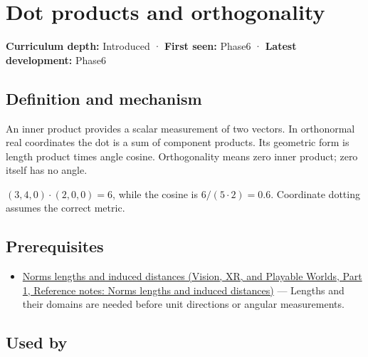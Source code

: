 \hypertarget{appendix-8bc4e8fc547c}{}\label{referencestart:appendix-8bc4e8fc547c}
\section{Dot products and orthogonality}\label{appendix-8bc4e8fc547c-dot-products-and-orthogonality}

\hypertarget{appendix-8bc4e8fc547c-dot-products-and-orthogonality}{}

\textbf{Curriculum depth:} Introduced · \textbf{First seen:} Phase6 · \textbf{Latest development:} Phase6

\begin{allmightroledefinition}

\subsection{Definition and mechanism}\label{appendix-8bc4e8fc547c-definition-and-mechanism}

\hypertarget{appendix-8bc4e8fc547c-definition-and-mechanism}{}

An inner product provides a scalar measurement of two vectors. In orthonormal real coordinates the dot is a sum of component products. Its geometric form is length product times angle cosine. Orthogonality means zero inner product; zero itself has no angle.

\end{allmightroledefinition}

\((3,4,0)\cdot(2,0,0)=6\), while the cosine is \(6/(5\cdot2)=0.6\). Coordinate dotting assumes the correct metric.

\subsection{Prerequisites}\label{appendix-8bc4e8fc547c-prerequisites}

\hypertarget{appendix-8bc4e8fc547c-prerequisites}{}

\begin{itemize}
\tightlist
\item
  \href{../07-Vision-XR-and-Playable-Worlds-P01/main.pdf\#appendix-49933872bb51}{Norms lengths and induced distances (Vision, XR, and Playable Worlds, Part 1, Reference notes: Norms lengths and induced distances)} --- Lengths and their domains are needed before unit directions or angular measurements.
\end{itemize}

\subsection{Used by}\label{appendix-8bc4e8fc547c-used-by}

